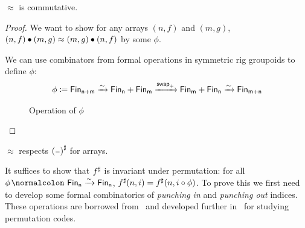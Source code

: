 \begin{proposition}\label{bag:comm}
    $\approx$ is commutative.
\end{proposition}

\begin{proof}
    We want to show for any arrays $(n, f)$ and $(m, g)$, $(n, f) \mathbin{\bullet} (m, g) \approx (m, g) \mathbin{\bullet} (n, f)$
    by some $\phi$.

    We can use combinators from formal operations in symmetric rig groupoids \cite{choudhurySymmetriesReversibleProgramming2022} to define $\phi$:
    \begin{align*}
        \phi \defeq \Fin[n+m] \xto{\sim} \Fin[n] + \Fin[m] \xto{\term{swap}_{+}} \Fin[m] + \Fin[n] \xto{\sim} \Fin[m+n] \\
    \end{align*}

    \begin{figure}[H]
        \centering
        \caption{Operation of $\phi$}
        \label{fig:enter-label}
    \end{figure}

\end{proof}

\begin{proposition}
    $\approx$ respects $\ext{(\blank)}$ for arrays.
\end{proposition}

It suffices to show that ${f}^{\sharp}$ is invariant under permutation: for all $\phi\colon \Fin[n]\xto{\sim}\Fin[n]$,
$\ext{f}(n, i) \id \ext{f}(n, i \circ \phi)$. To prove this we first need to develop some formal combinatorics of
\emph{punching in} and \emph{punching out} indices. These operations are
borrowed from~\cite{mozlerCubicalAgdaSimple2021} and
developed further
in~\cite{choudhurySymmetriesReversibleProgramming2022} for studying permutation codes.

